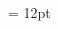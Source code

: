 \documentclass[gps1,twoside]{article}
\begin{document}
\setlength\columnseprule{0.4pt} 
\begin{multicols}{2}\begin{spacing}{0.458333333333333}{\raggedright} \begin{spacing}{0.458333333333333}
\hangindent= 12pt
  \\ \headwordafterentryletDatadicBody{}\spanenpronunciationggofonipaxemicspanentryletDatadicBody{[}\spanenpronunciationggofonipaxemicspanentryletDatadicBody{]}  \grammaticalinfoaftersensespanentryletDatadicBody{} \end{spacing}
 \end{spacing}\end{multicols}
\end{document}
